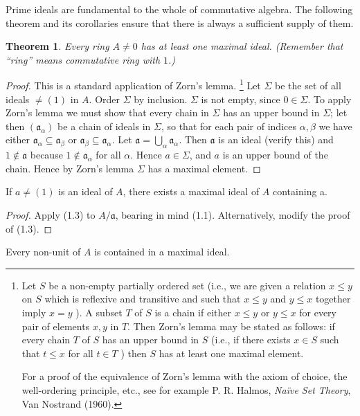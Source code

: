 \documentclass[class=book, crop=false]{standalone}
\newtheorem{theorem}{Theorem}[chapter]
\theoremstyle{definition}
\theoremstyle{remark}
\begin{document}
Prime ideals are fundamental to the whole of commutative algebra. The following
theorem and its corollaries ensure that there is always a sufficient supply of
them.
\begin{theorem}
  Every ring $A \neq 0$ has at least one maximal ideal. \textnormal{(Remember
    that ``ring'' means commutative ring with $1$.)}
\end{theorem}
\begin{proof}
  This is a standard application of Zorn's lemma. \footnote{Let $S$ be a
    non-empty partially ordered set (i.e., we are given a relation $x \leq y$ on
    $S$ which is reflexive and transitive and such that $x \leq y$ and
    $y \leq x$ together imply $x=y$ ). A subset $T$ of $S$ is a chain if either
    $x \leq y$ or $y \leq x$ for every pair of elements $x, y$ in $T$. Then
    Zorn's lemma may be stated as follows: if every chain $T$ of $S$ has an
    upper bound in $S$ (i.e., if there exists $x \in S$ such that $t \leq x$ for
    all $t \in T$ ) then $S$ has at least one maximal element.

    For a proof of the equivalence of Zorn's lemma with the axiom of choice, the
    well-ordering principle, etc., see for example P. R. Halmos, \textit{Na\"ive
      Set Theory}, Van Nostrand (1960).} Let $\Sigma$ be the set of all ideals
  $\ne (1)$ in $A$. Order $\Sigma$ by inclusion. $\Sigma$ is not empty, since
  $0 \in \Sigma$. To apply Zorn's lemma we must show that every chain in
  $\Sigma$ has an upper bound in $\Sigma$; let then
  $\left(\mathfrak{a}_{\alpha}\right)$ be a chain of ideals in $\Sigma$, so that
  for each pair of indices $\alpha, \beta$ we have either
  $\mathfrak{a}_{\alpha} \subseteq \mathfrak{a}_{\beta}$ or
  $\mathfrak{a}_{\beta} \subseteq \mathfrak{a}_{\alpha}$. Let
  $\mathfrak{a}=\bigcup_{\alpha} \mathfrak{a}_{\alpha}$. Then $\mathfrak{a}$ is
  an ideal (verify this) and $1 \notin \mathfrak{a}$ because
  $1 \notin \mathfrak{a}_{\alpha}$ for all $\alpha$. Hence $a \in \Sigma$, and
  $a$ is an upper bound of the chain. Hence by Zorn's lemma $\Sigma$ has a
  maximal element.
\end{proof}
\begin{corollary}
  If $a \neq(1)$ is an ideal of $A$, there exists a maximal ideal of $A$
  containing a.
\end{corollary}
\begin{proof}
  Apply (1.3) to $A / \mathfrak{a}$, bearing in mind (1.1). Alternatively,
  modify the proof of (1.3).
\end{proof}
\begin{corollary}
  Every non-unit of $A$ is contained in a maximal ideal.
\end{corollary}
\end{document}
